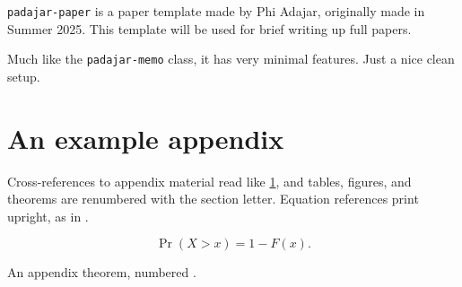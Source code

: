 \documentclass[11pt]{padajar-paper}
\date{\today}
\author{Alice P. Hacker}
\affil{MIT}
\author{Ben Bitdiddle}
\affil{MIT}
\author{John Q. Smith}
\affil{Harvard}
\begin{document}
	
	\maketitle
	

		\texttt{padajar-paper} is a paper template made by Phi Adajar, originally made in Summer 2025. This template will be used for brief writing up full papers.

		Much like the \texttt{padajar-memo} class, it has very minimal features. Just a nice clean setup.

		\Blindtext[1]
		\lipsum[1-2]
		\Blindtext[1]
		\lipsum[3-4]
		\Blindtext[1]
		\lipsum[5-7]

\appendix
\section{An example appendix}\label{app:demo}

Cross-references to appendix material read like \cref{app:demo}, and tables, figures, and theorems are renumbered with the section letter. Equation references print upright, as in .

\begin{equation}\label{eq:tail}
	\Pr(X > x) = 1 - F(x).
\end{equation}

\begin{theorem}\label{thm:demo}
	An appendix theorem, numbered \thetheorem.
\end{theorem}
\end{document}
